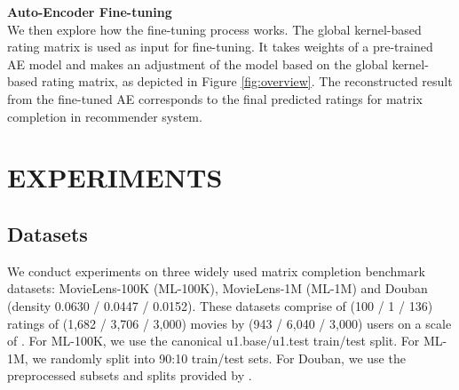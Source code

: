 \documentclass[sigconf]{acmart}
\begin{document}
\medskip
\noindent\textbf{Auto-Encoder Fine-tuning}\\
We then explore how the fine-tuning process works. The global kernel-based rating matrix  is used as input for fine-tuning. It takes weights of a pre-trained AE model and makes an adjustment of the model based on the global kernel-based rating matrix, as depicted in Figure \ref{fig:overview}. The reconstructed result from the fine-tuned AE corresponds to the final predicted ratings for matrix completion in recommender system.

\section{EXPERIMENTS}
\subsection{Datasets}
We conduct experiments on three widely used matrix completion benchmark datasets:  MovieLens-100K (ML-100K), MovieLens-1M (ML-1M) and Douban (density 0.0630 / 0.0447 / 0.0152). These datasets comprise of (\SI{100}{\smallk} / \SI{1}{\million} / \SI{136}{\smallk}) ratings of (1,682 / 3,706 / 3,000) movies by (943 / 6,040 / 3,000) users on a scale of . For ML-100K, we use the canonical u1.base/u1.test train/test split. For ML-1M, we randomly split into 90:10 train/test sets. For Douban, we use the preprocessed subsets and splits provided by \citet{monti2017geometric}.
\end{document}
